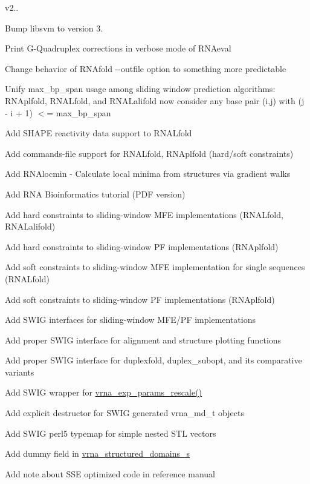 v2..
\begin{DoxyItemize}
\item Bump libsvm to version 3.
\item Print G-\/\+Quadruplex corrections in verbose mode of R\+N\+Aeval
\item Change behavior of R\+N\+Afold -\/-\/outfile option to something more predictable
\item Unify max\+\_\+bp\+\_\+span usage among sliding window prediction algorithms\+: R\+N\+Aplfold, R\+N\+A\+Lfold, and R\+N\+A\+Lalifold now consider any base pair (i,j) with (j -\/ i + 1) $<$= max\+\_\+bp\+\_\+span
\item Add S\+H\+A\+PE reactivity data support to R\+N\+A\+Lfold
\item Add commands-\/file support for R\+N\+A\+Lfold, R\+N\+Aplfold (hard/soft constraints)
\item Add R\+N\+Alocmin -\/ Calculate local minima from structures via gradient walks
\item Add R\+NA Bioinformatics tutorial (P\+DF version)
\item Add hard constraints to sliding-\/window M\+FE implementations (R\+N\+A\+Lfold, R\+N\+A\+Lalifold)
\item Add hard constraints to sliding-\/window PF implementations (R\+N\+Aplfold)
\item Add soft constraints to sliding-\/window M\+FE implementation for single sequences (R\+N\+A\+Lfold)
\item Add soft constraints to sliding-\/window PF implementations (R\+N\+Aplfold)
\item Add S\+W\+IG interfaces for sliding-\/window M\+F\+E/\+PF implementations
\item Add proper S\+W\+IG interface for alignment and structure plotting functions
\item Add proper S\+W\+IG interface for duplexfold, duplex\+\_\+subopt, and its comparative variants
\item Add S\+W\+IG wrapper for \hyperlink{group__energy__parameters_gad607bc3a5b5da16400e2ca4ea5560233}{vrna\+\_\+exp\+\_\+params\+\_\+rescale()}
\item Add explicit destructor for S\+W\+IG generated vrna\+\_\+md\+\_\+t objects
\item Add S\+W\+IG perl5 typemap for simple nested S\+TL vectors
\item Add dummy field in \hyperlink{structvrna__structured__domains__s}{vrna\+\_\+structured\+\_\+domains\+\_\+s}
\item Add note about S\+SE optimized code in reference manual

\end{DoxyItemize}
